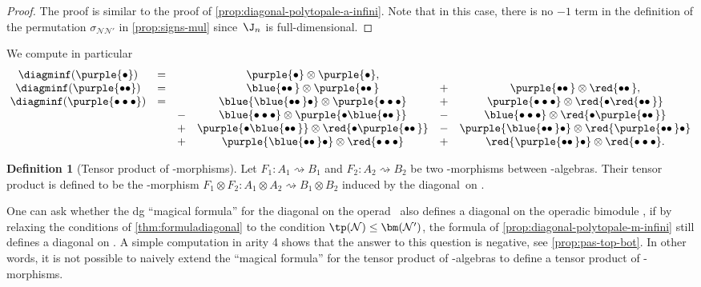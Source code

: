 \documentclass[JEP,XML,SOM,NoFloatCountersInSection,Unicode,published]{cedram}
\newcommand{\twobullets}{\bullet\bullet\mkern3mu}
\theoremstyle{definition}
\newtheorem{definition}{Definition}[section]
\theoremstyle{plain}
\begin{document}
\begin{proof}
The proof is similar to the proof of \cref{prop:diagonal-polytopale-a-infini}.
Note that in this case, there is no $-1$ term in the definition of the permutation $\sigma_{\mathcal{N}\mathcal{N}'}$ in \cref{prop:signs-mul} since~$\J_n$ is full-dimensional.
\end{proof}

We compute in particular
\[
\begin{matrix}
\diagminf (\purple{ \bullet })
&=& & \purple{ \bullet } \otimes \purple{ \bullet }, & & \\
\diagminf (\purple{ \bullet \bullet })
&=& & \blue{\twobullets} \otimes \purple{\twobullets} & + & \purple{\twobullets} \otimes \red{\twobullets}, \\
\diagminf (\purple{\bullet \bullet \bullet})
&=&
& \blue{\blue{\twobullets}\bullet} \otimes \purple{\bullet \bullet \bullet}
& + & \purple{\bullet \bullet \bullet} \otimes \red{\bullet \red{\twobullets}} \\
& &- & \blue{\bullet \bullet \bullet} \otimes \purple{\bullet \blue{\twobullets}} & - & \blue{\bullet \bullet \bullet} \otimes \red{\bullet \purple{\twobullets}} \\ & &+ & \purple{\bullet \blue{\twobullets}} \otimes \red{\bullet \purple{\twobullets}}
& - & \purple{\blue{\twobullets} \bullet} \otimes \red{\purple{\twobullets} \bullet} \\ & & + & \purple{\blue{\twobullets} \bullet} \otimes \red{\bullet \bullet \bullet} & + & \red{\purple{\twobullets} \bullet} \otimes \red{\bullet \bullet \bullet}.
\end{matrix}
\]

\begin{definition}[Tensor product of \Ainf -morphisms] \label{def:tensor-ainf-morph}
Let $F_1 : A_1 \rightsquigarrow B_1$ and $F_2 : A_2 \rightsquigarrow B_2$ be two \Ainf -morphisms between \Ainf-algebras.
Their tensor product is defined to be the \Ainf -morphism $F_1 \otimes F_2 : A_1 \otimes A_2 \rightsquigarrow B_1 \otimes B_2$ induced by the diagonal~\diagminf on \Minf.
\end{definition}

One can ask whether the dg ``magical formula'' for the diagonal on the operad \Ainf\
also defines a diagonal on the operadic bimodule \Minf, \ie if by relaxing the conditions of \cref{thm:formuladiagonal} to the condition $\tp(\mathcal{N}) \leq \bm(\mathcal{N'})$, the formula of \cref{prop:diagonal-polytopale-m-infini} still defines a diagonal on \Minf. A simple computation in arity 4 shows that the answer to this question is negative, see \cref{prop:pas-top-bot}. In other words, it is not possible to naively extend the ``magical formula'' for the tensor product of \Ainf -algebras to define a tensor product of \Ainf -morphisms.
\end{document}

